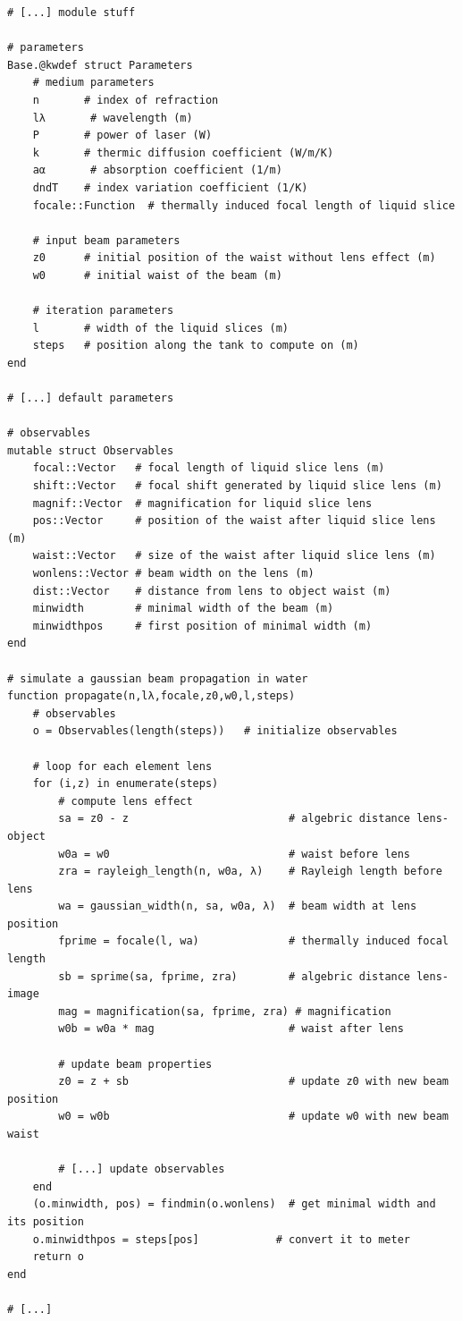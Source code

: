 \juliastyle
\begin{lstlisting}
# [...] module stuff

# parameters
Base.@kwdef struct Parameters
    # medium parameters
    n       # index of refraction
    lλ       # wavelength (m)
    P       # power of laser (W)
    k       # thermic diffusion coefficient (W/m/K)
    aα       # absorption coefficient (1/m)
    dndT    # index variation coefficient (1/K)
    focale::Function  # thermally induced focal length of liquid slice

    # input beam parameters    
    z0      # initial position of the waist without lens effect (m)
    w0      # initial waist of the beam (m)
    
    # iteration parameters
    l       # width of the liquid slices (m)
    steps   # position along the tank to compute on (m)
end

# [...] default parameters
   
# observables
mutable struct Observables
    focal::Vector   # focal length of liquid slice lens (m)
    shift::Vector   # focal shift generated by liquid slice lens (m)
    magnif::Vector  # magnification for liquid slice lens 
    pos::Vector     # position of the waist after liquid slice lens (m)
    waist::Vector   # size of the waist after liquid slice lens (m)
    wonlens::Vector # beam width on the lens (m)
    dist::Vector    # distance from lens to object waist (m)
    minwidth        # minimal width of the beam (m)
    minwidthpos     # first position of minimal width (m)
end

# simulate a gaussian beam propagation in water
function propagate(n,lλ,focale,z0,w0,l,steps)
    # observables
    o = Observables(length(steps))   # initialize observables

    # loop for each element lens
    for (i,z) in enumerate(steps)        
        # compute lens effect
        sa = z0 - z                         # algebric distance lens-object
        w0a = w0                            # waist before lens
        zra = rayleigh_length(n, w0a, λ)    # Rayleigh length before lens
        wa = gaussian_width(n, sa, w0a, λ)  # beam width at lens position
        fprime = focale(l, wa)              # thermally induced focal length
        sb = sprime(sa, fprime, zra)        # algebric distance lens-image
        mag = magnification(sa, fprime, zra) # magnification
        w0b = w0a * mag                     # waist after lens

        # update beam properties
        z0 = z + sb                         # update z0 with new beam position
        w0 = w0b                            # update w0 with new beam waist

        # [...] update observables
    end
    (o.minwidth, pos) = findmin(o.wonlens)  # get minimal width and its position
    o.minwidthpos = steps[pos]            # convert it to meter
    return o
end

# [...]
\end{lstlisting}

